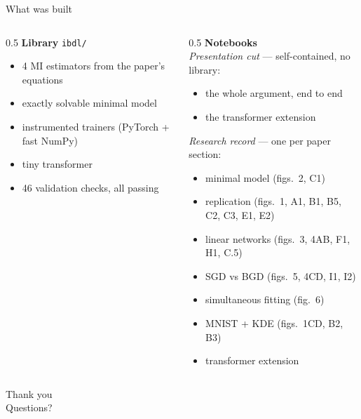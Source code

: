 \documentclass[aspectratio=169,11pt]{beamer}
\begin{document}
\begin{frame}{What was built}
\begin{columns}[T]
\begin{column}{0.5\textwidth}
\textbf{Library} \texttt{ibdl/}
\begin{itemize}\small
  \item 4 MI estimators from the paper's equations
  \item exactly solvable minimal model
  \item instrumented trainers (PyTorch + fast NumPy)
  \item tiny transformer
  \item 46 validation checks, all passing
\end{itemize}
\end{column}
\begin{column}{0.5\textwidth}
\textbf{Notebooks}\\[2pt]
{\small\emph{Presentation cut} --- self-contained, no library:}
\begin{itemize}\small
  \item[1] the whole argument, end to end
  \item[2] the transformer extension
\end{itemize}
\smallskip
{\small\emph{Research record} --- one per paper section:}
\begin{itemize}\footnotesize
  \item[01] minimal model (figs.\ 2, C1)
  \item[02] replication (figs.\ 1, A1, B1, B5, C2, C3, E1, E2)
  \item[03] linear networks (figs.\ 3, 4AB, F1, H1, C.5)
  \item[04] SGD vs BGD (figs.\ 5, 4CD, I1, I2)
  \item[05] simultaneous fitting (fig.\ 6)
  \item[06] MNIST + KDE (figs.\ 1CD, B2, B3)
  \item[07] transformer extension
\end{itemize}
\end{column}
\end{columns}
\end{frame}

\begin{frame}[plain]
\begin{center}
\Huge Thank you\\[10pt]
\normalsize Questions?
\end{center}
\end{frame}
\end{document}
